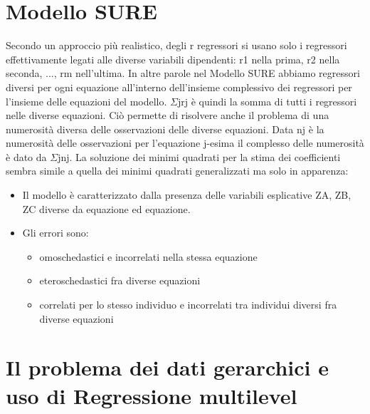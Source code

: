 \documentclass[a4page, 11pt]{article}
\begin{document}
\section{Modello SURE}

Secondo un approccio più realistico, degli r regressori si usano solo i regressori effettivamente legati alle diverse variabili dipendenti: r1 nella prima, r2 nella seconda, ..., rm nell’ultima.
\newline
In altre parole nel Modello SURE abbiamo regressori diversi per ogni equazione all’interno dell’insieme complessivo dei regressori per l’insieme delle equazioni del modello. 
\newline
$\Sigma$jrj è quindi la somma di tutti i regressori nelle diverse equazioni.
\newline
Ciò permette di risolvere anche il problema di una numerosità diversa delle osservazioni delle diverse equazioni. Data nj è la numerosità delle osservazioni per l’equazione j-esima il complesso delle numerosità è dato da $\Sigma$jnj.
\newline
\newline
La soluzione dei minimi quadrati per la stima dei coefficienti sembra simile a quella dei minimi quadrati generalizzati ma solo in apparenza: 
\begin{itemize}
\item Il modello è caratterizzato dalla presenza delle variabili esplicative ZA, ZB, ZC diverse da equazione ed equazione.
\item Gli errori sono:
	\begin{itemize}[noitemsep]
	\item omoschedastici e incorrelati nella stessa equazione
	\item eteroschedastici fra diverse equazioni
	\item correlati per lo stesso individuo e incorrelati tra individui diversi fra diverse equazioni
	\end{itemize}
\end{itemize}

\section{Il problema dei dati gerarchici e uso di Regressione multilevel}
\end{document}
